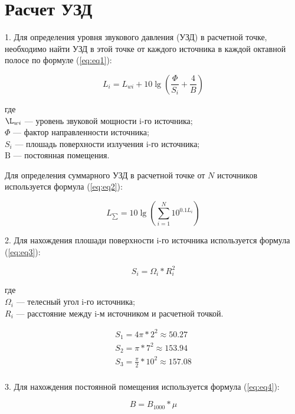 \section*{Расчет УЗД}

1. Для определения уровня звукового давления (УЗД) в расчетной точке, необходимо найти УЗД в этой точке от каждого источника в каждой октавной полосе по формуле (\ref{eq:eq1}):

\begin{equation}
	\label{eq:eq1}
	L_{i} = L_{wi} + 10 \lg(\frac{\Phi}{S_{i}} + \frac{4}{B})
\end{equation}

\noindent где\\
$\L_{wi}$ --- уровень звуковой мощности i-го источника;\\
$\Phi$ --- фактор направленности источника;\\
$S_{i}$ --- плошадь поверхности излучения i-го источника;\\
$\text{B}$ --- постоянная помещения.

Для определения суммарного УЗД в расчетной точке от $N$ источников используется формула (\ref{eq:eq2}):

\begin{equation}
	\label{eq:eq2}
	L_{\sum} = 10\lg(\sum_{i=1}^{N} 10^{0.1 L_{i}})
\end{equation}

2. Для нахождения плошади поверхности i-го источника используется формула (\ref{eq:eq3}):

\begin{equation}
	\label{eq:eq3}
	S_{i} = \Omega_{i} * R_{i}^{2}
\end{equation}

\noindent где  \\
$\Omega_{i}$ --- телесный угол i-го источника; \\
$R_{i}$ --- расстояние между i-м источником и расчетной точкой.

\begin{align*}
	S_{1} = 4\pi * 2^2 \approx 50.27 \\
	S_{2} = \pi * 7^2 \approx 153.94\\
	S_{3} = \frac{\pi}{2}*10^2 \approx 157.08 \\ 
\end{align*}

3. Для нахождения постоянной помещения используется формула (\ref{eq:eq4}):

\begin{equation}
	\label{eq:eq4}
	B = B_{1000} * \mu
\end{equation}

